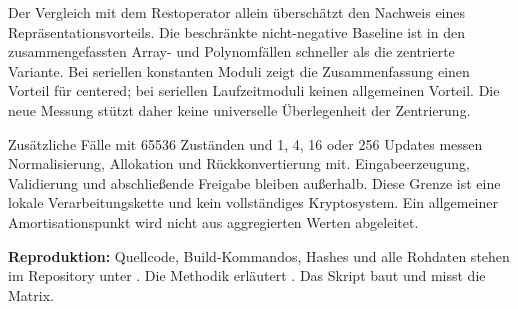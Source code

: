 Der Vergleich mit dem Restoperator allein überschätzt den Nachweis eines
Repräsentationsvorteils. Die beschränkte nicht-negative Baseline ist in
den zusammengefassten Array- und Polynomfällen schneller als die zentrierte
Variante. Bei seriellen konstanten Moduli zeigt die Zusammenfassung einen
Vorteil für centered; bei seriellen Laufzeitmoduli keinen allgemeinen Vorteil.
Die neue Messung stützt daher keine universelle Überlegenheit der Zentrierung.

Zusätzliche Fälle mit 65536 Zuständen und 1, 4, 16 oder 256 Updates
messen Normalisierung, Allokation und Rückkonvertierung mit. Eingabeerzeugung,
Validierung und abschließende Freigabe bleiben außerhalb. Diese Grenze ist
eine lokale Verarbeitungskette und kein vollständiges Kryptosystem.
Ein allgemeiner Amortisationspunkt wird nicht aus aggregierten Werten abgeleitet.

\noindent\textbf{Reproduktion:} Quellcode, Build-Kommandos, Hashes und alle
Rohdaten stehen im Repository unter .
Die Methodik erläutert .
Das Skript  baut und misst die Matrix.
